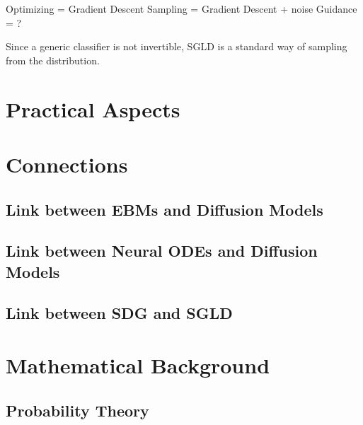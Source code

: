 \documentclass[a4paper, 11pt]{article}
\begin{document}
Optimizing = Gradient Descent
Sampling = Gradient Descent + noise
Guidance = ?

Since a generic classifier is not invertible, SGLD is a standard way of sampling from the distribution.

\section{Practical Aspects}

\section{Connections}
\subsection{Link between EBMs and Diffusion Models}
\subsection{Link between Neural ODEs and Diffusion Models}
\subsection{Link between SDG and SGLD}

\appendix
\section{Mathematical Background}
\subsection{Probability Theory}


 

\end{document}
